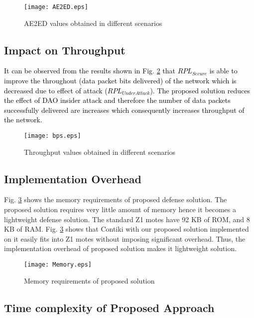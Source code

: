 \documentclass[conference, a4paper]{IEEEtran}
\begin{document}
\begin{figure}[h]
    \centering
    \texttt{[image: AE2ED.eps]}
    \caption{AE2ED values obtained in different scenarios}
    \label{fig:AE2ED}
\end{figure}


\subsection{Impact on Throughput}
\textcolor{black}{It can be observed from the results shown in Fig. \ref{fig:TP} that $RPL_{Secure}$ is able to improve the throughout (data packet bits delivered) of the network which is decreased due to effect of attack ($RPL_{Under Attack}$). The proposed solution reduces the effect of DAO insider attack and therefore the number of data packets successfully delivered are increases which consequently increases throughput of the network.}

\begin{figure}[h]
    \centering
    \texttt{[image: bps.eps]}
    \caption{Throughput values obtained in different scenarios}
    \label{fig:TP}
\end{figure}

\subsection{Implementation Overhead}

Fig. \ref{fig:memory} shows the memory requirements of proposed defense solution. The proposed solution requires very little amount of memory hence it becomes a lightweight defense solution. The standard Z1 motes have 92 KB of ROM, and 8 KB of RAM. Fig. \ref{fig:memory} shows that Contiki with our proposed solution implemented on it easily fits into Z1 motes without imposing significant overhead. Thus, the implementation overhead of proposed solution makes it lightweight solution.

\begin{figure}[h]
    \centering
    \texttt{[image: Memory.eps]}
    \caption{Memory requirements of proposed solution}
    \label{fig:memory}
\end{figure}

\subsection{Time complexity of Proposed Approach}
\end{document}

